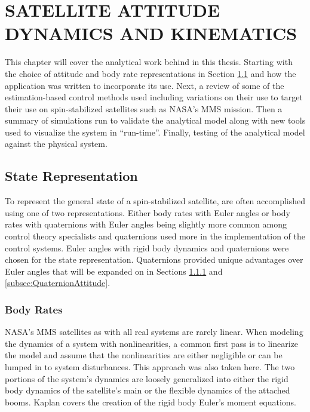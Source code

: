 
\chapter{SATELLITE ATTITUDE DYNAMICS AND KINEMATICS}
\label{chap:SatelliteAttitudeDynamicsAndKinematics}

This chapter will cover the analytical work behind in this thesis.  Starting with the choice of attitude and body rate representations in Section \ref{sec:StateRepresentation} and how the application was written to incorporate its use.  Next, a review of some of the estimation-based control methods used including variations on their use to target their use on spin-stabilized satellites such as NASA's MMS mission.  Then a summary of simulations run to validate the analytical model along with new tools used to visualize the system in ``run-time''.  Finally, testing of the analytical model against the physical system.

\section{State Representation}
\label{sec:StateRepresentation}

To represent the general state of a spin-stabilized satellite, are often accomplished using one of two representations.  Either body rates with Euler angles or body rates with quaternions with Euler angles being slightly more common among control theory specialists and quaternions used more in the implementation of the control systems.  Euler angles with rigid body dynamics and quaternions were chosen for the state representation.  Quaternions provided unique advantages over Euler angles that will be expanded on in Sections \ref{subsec:BodyRate} and \ref{subsec:QuaternionAttitude}.

\subsection{Body Rates}
\label{subsec:BodyRate}

NASA's MMS satellites as with all real systems are rarely linear.  When modeling the dynamics of a system with nonlinearities, a common first pass is to linearize the model and assume that the nonlinearities are either negligible or can be lumped in to system disturbances.  This approach was also taken here.  The two portions of the system's dynamics are loosely generalized into either the rigid body dynamics of the satellite's main or the flexible dynamics of the attached booms.  Kaplan \cite{kaplan} covers the creation of the rigid body Euler's moment equations.

